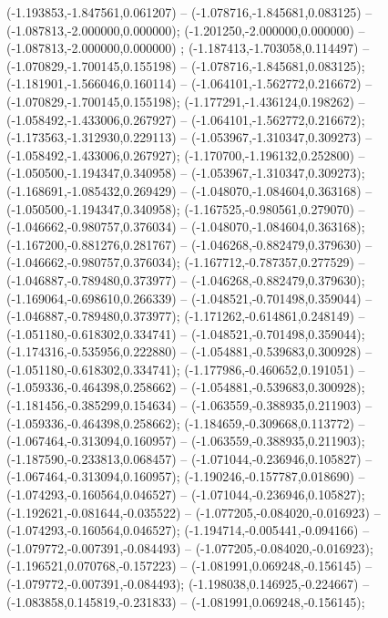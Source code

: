  (-1.193853,-1.847561,0.061207) -- (-1.078716,-1.845681,0.083125) -- (-1.087813,-2.000000,0.000000);
 (-1.201250,-2.000000,0.000000) -- (-1.087813,-2.000000,0.000000) ;
 (-1.187413,-1.703058,0.114497) -- (-1.070829,-1.700145,0.155198) -- (-1.078716,-1.845681,0.083125);
 (-1.181901,-1.566046,0.160114) -- (-1.064101,-1.562772,0.216672) -- (-1.070829,-1.700145,0.155198);
 (-1.177291,-1.436124,0.198262) -- (-1.058492,-1.433006,0.267927) -- (-1.064101,-1.562772,0.216672);
 (-1.173563,-1.312930,0.229113) -- (-1.053967,-1.310347,0.309273) -- (-1.058492,-1.433006,0.267927);
 (-1.170700,-1.196132,0.252800) -- (-1.050500,-1.194347,0.340958) -- (-1.053967,-1.310347,0.309273);
 (-1.168691,-1.085432,0.269429) -- (-1.048070,-1.084604,0.363168) -- (-1.050500,-1.194347,0.340958);
 (-1.167525,-0.980561,0.279070) -- (-1.046662,-0.980757,0.376034) -- (-1.048070,-1.084604,0.363168);
 (-1.167200,-0.881276,0.281767) -- (-1.046268,-0.882479,0.379630) -- (-1.046662,-0.980757,0.376034);
 (-1.167712,-0.787357,0.277529) -- (-1.046887,-0.789480,0.373977) -- (-1.046268,-0.882479,0.379630);
 (-1.169064,-0.698610,0.266339) -- (-1.048521,-0.701498,0.359044) -- (-1.046887,-0.789480,0.373977);
 (-1.171262,-0.614861,0.248149) -- (-1.051180,-0.618302,0.334741) -- (-1.048521,-0.701498,0.359044);
 (-1.174316,-0.535956,0.222880) -- (-1.054881,-0.539683,0.300928) -- (-1.051180,-0.618302,0.334741);
 (-1.177986,-0.460652,0.191051) -- (-1.059336,-0.464398,0.258662) -- (-1.054881,-0.539683,0.300928);
 (-1.181456,-0.385299,0.154634) -- (-1.063559,-0.388935,0.211903) -- (-1.059336,-0.464398,0.258662);
 (-1.184659,-0.309668,0.113772) -- (-1.067464,-0.313094,0.160957) -- (-1.063559,-0.388935,0.211903);
 (-1.187590,-0.233813,0.068457) -- (-1.071044,-0.236946,0.105827) -- (-1.067464,-0.313094,0.160957);
 (-1.190246,-0.157787,0.018690) -- (-1.074293,-0.160564,0.046527) -- (-1.071044,-0.236946,0.105827);
 (-1.192621,-0.081644,-0.035522) -- (-1.077205,-0.084020,-0.016923) -- (-1.074293,-0.160564,0.046527);
 (-1.194714,-0.005441,-0.094166) -- (-1.079772,-0.007391,-0.084493) -- (-1.077205,-0.084020,-0.016923);
 (-1.196521,0.070768,-0.157223) -- (-1.081991,0.069248,-0.156145) -- (-1.079772,-0.007391,-0.084493);
 (-1.198038,0.146925,-0.224667) -- (-1.083858,0.145819,-0.231833) -- (-1.081991,0.069248,-0.156145);
